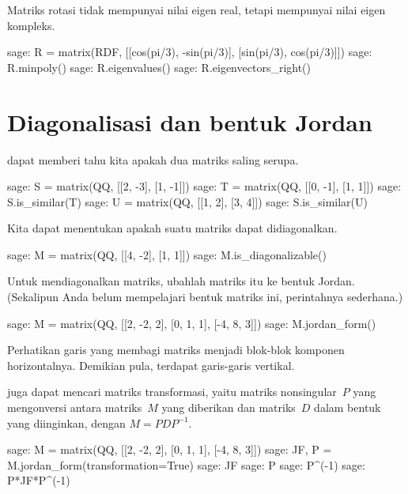 Matriks rotasi tidak mempunyai nilai eigen real, tetapi mempunyai nilai eigen
kompleks.
\begin{sagecommandline}
sage: R = matrix(RDF, [[cos(pi/3), -sin(pi/3)], [sin(pi/3), cos(pi/3)]])
sage: R.minpoly()
sage: R.eigenvalues()
sage: R.eigenvectors_right()
\end{sagecommandline}




\section{Diagonalisasi dan bentuk Jordan}

\Sage{} dapat memberi tahu kita apakah dua matriks saling serupa.
\begin{sagecommandline}
sage: S =  matrix(QQ, [[2, -3], [1, -1]]) 
sage: T =  matrix(QQ, [[0, -1], [1,  1]]) 
sage: S.is_similar(T)
sage: U =  matrix(QQ, [[1, 2], [3,  4]]) 
sage: S.is_similar(U)
\end{sagecommandline}
\noindent

Kita dapat menentukan apakah suatu matriks dapat didiagonalkan.
\begin{sagecommandline}
sage: M =  matrix(QQ, [[4, -2], [1, 1]])  
sage: M.is_diagonalizable()
\end{sagecommandline}
\noindent
Untuk mendiagonalkan matriks, ubahlah matriks itu ke bentuk Jordan.
(Sekalipun Anda belum mempelajari bentuk matriks ini, perintahnya sederhana.)
\begin{sagecommandline}
sage: M =  matrix(QQ, [[2, -2, 2], [0, 1, 1], [-4, 8, 3]])  
sage: M.jordan_form()
\end{sagecommandline}
Perhatikan garis \inlinecode{-+-+-} yang membagi matriks menjadi blok-blok
komponen horizontalnya.
Demikian pula, terdapat garis-garis vertikal.

\Sage{} juga dapat mencari matriks transformasi, yaitu matriks nonsingular~$P$
yang mengonversi antara matriks~$M$ yang diberikan dan matriks~$D$ dalam bentuk
yang diinginkan, dengan $M=PDP^{-1}$.
\begin{sagecommandline}[d,0,1]
sage: M =  matrix(QQ, [[2, -2, 2], [0, 1, 1], [-4, 8, 3]])  
sage: JF, P = M.jordan_form(transformation=True)
sage: JF
sage: P
sage: P^(-1)
sage: P*JF*P^(-1)
\end{sagecommandline}

